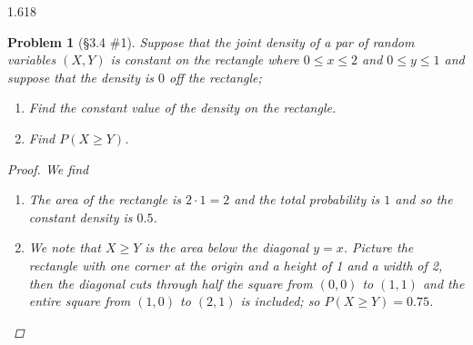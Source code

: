 \documentclass[11pt, oneside]{book}   	%
\newtheorem{problem}{Problem}[section]
\begin{document}
\begin{spacing}{1.618}
			\begin{problem}[\S 3.4 \#1]
				Suppose that the joint density of a par of random variables $(X, Y)$ is constant on the rectangle where $0 \leq x \leq 2$ and $0\leq y \leq 1$ and suppose that the density is $0$ off the rectangle;
				\begin{enumerate}
					\item Find the constant value of the density on the rectangle.
					\item Find $P( X \geq Y)$. 
				\end{enumerate}
				\begin{proof}
					We find 
					\begin{enumerate}
						\item The area of the rectangle is $2\cdot 1 = 2$ and the total probability is $1$ and so the constant density is $0.5$.
						\item We note that $X\geq Y$ is the area below the diagonal $y=x$. Picture the rectangle with one corner at the origin and a height of 1 and a width of 2, then the diagonal cuts through half the square from $(0, 0)$ to $(1, 1)$ and the entire square from $(1, 0)$ to $(2, 1)$ is included; so $P(X\geq Y)=0.75$. 
					\end{enumerate}
				\end{proof}
			\end{problem}
			

\end{spacing}
\end{document}

